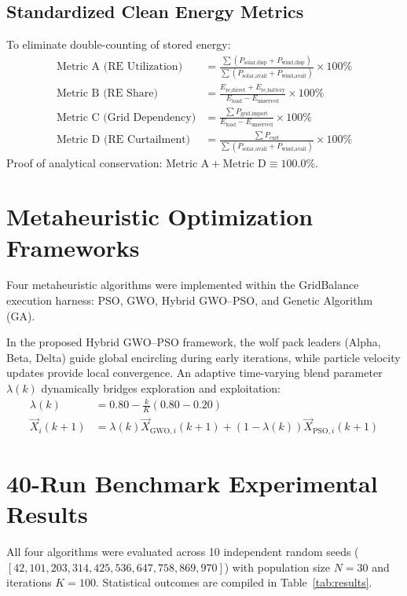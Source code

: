 \documentclass[journal,10pt,twocolumn]{IEEEtran}
\begin{document}
\subsection{Standardized Clean Energy Metrics}
To eliminate double-counting of stored energy:
\begin{align}
\text{Metric A (RE Utilization)} &= \frac{\sum (P_{\text{solar,disp}} + P_{\text{wind,disp}})}{\sum (P_{\text{solar,avail}} + P_{\text{wind,avail}})} \times 100\% \\
\text{Metric B (RE Share)} &= \frac{E_{\text{re,direct}} + E_{\text{re,battery}}}{E_{\text{load}} - E_{\text{unserved}}} \times 100\% \\
\text{Metric C (Grid Dependency)} &= \frac{\sum P_{\text{grid,import}}}{E_{\text{load}} - E_{\text{unserved}}} \times 100\% \\
\text{Metric D (RE Curtailment)} &= \frac{\sum P_{\text{curt}}}{\sum (P_{\text{solar,avail}} + P_{\text{wind,avail}})} \times 100\%
\end{align}
Proof of analytical conservation: $\text{Metric A} + \text{Metric D} \equiv 100.0\%$.

\section{Metaheuristic Optimization Frameworks}
Four metaheuristic algorithms were implemented within the GridBalance execution harness: PSO, GWO, Hybrid GWO--PSO, and Genetic Algorithm (GA).

In the proposed Hybrid GWO--PSO framework, the wolf pack leaders (Alpha, Beta, Delta) guide global encircling during early iterations, while particle velocity updates provide local convergence. An adaptive time-varying blend parameter $\lambda(k)$ dynamically bridges exploration and exploitation:
\begin{align}
\lambda(k) &= 0.80 - \frac{k}{K}(0.80 - 0.20) \\
\vec{X}_i(k+1) &= \lambda(k) \vec{X}_{\text{GWO},i}(k+1) + (1 - \lambda(k)) \vec{X}_{\text{PSO},i}(k+1)
\end{align}

\section{40-Run Benchmark Experimental Results}
All four algorithms were evaluated across 10 independent random seeds ($[42, 101, 203, 314, 425, 536, 647, 758, 869, 970]$) with population size $N=30$ and iterations $K=100$. Statistical outcomes are compiled in Table~\ref{tab:results}.
\end{document}
